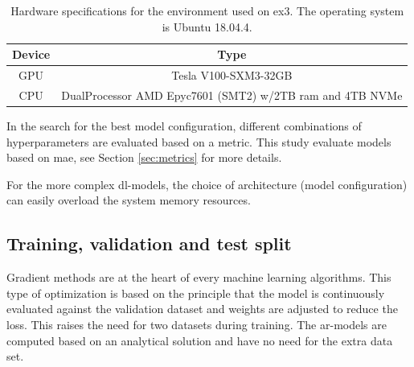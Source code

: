\begin{table}[ht]
    \centering
    \begin{tabular}{c|c}
        Device &  Type  \\ \hline
        GPU & Tesla V100-SXM3-32GB \\
        CPU & DualProcessor AMD Epyc7601 (SMT2) w/2TB ram and 4TB NVMe 
    \end{tabular}
    \caption{Hardware specifications for the environment used on \acrshort{ex3}. The operating system is Ubuntu 18.04.4.}
    \label{tab:hardware_ex3}
\end{table}

In the search for the best model configuration, different combinations of hyperparameters are evaluated based on a metric. %
This study evaluate models based on \acrfull{mae}, see Section \ref{sec:metrics} for more details.

For the more complex \acrshort{dl}-models, the choice of architecture (model configuration) can easily overload the system memory resources. 





\subsection{Training, validation and test split}
Gradient methods are at the heart of every machine 
learning algorithms. This type of optimization is based on the principle that the model is continuously evaluated against the validation dataset and weights are adjusted to reduce the loss. This raises the need for two datasets during training. The \acrshort{ar}-models are computed based on an analytical solution and have no need for the extra data set. 

